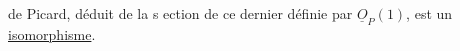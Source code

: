de Picard, déduit de la s ection de ce dernier définie par $\underline{O}_P(1)$, est un
\uline{isomorphisme}.

